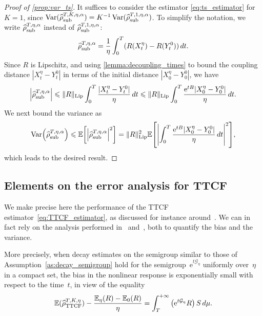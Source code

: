 \documentclass[11pt]{article}
\newcommand{\E}{\mathbb{E}}
\newcommand{\e}{\mathrm{e}}
\renewcommand{\leq}{\leqslant}
\DeclareMathOperator{\Var}{Var}
\DeclarePairedDelimiter\abs{\lvert}{\rvert}
\DeclarePairedDelimiter\paren{\lparen}{\rparen}
\DeclarePairedDelimiter\bkt{\lbrack}{\rbrack}
\theoremstyle{definition}
\newcommand{\G}{\mathcal{G}}
\newcommand{\TestTTCF}{\estTmp^{T,K,\eta}_{\rm TTCF}}
\newcommand{\RLip}{\|R\|_{\rm Lip}}
\newcommand{\estTmp}{\widehat{\rho}}
\newcommand{\asTSest}{\estTmp^{T,\eta,\alpha}_{\rm sub}} %
\newcommand{\aTSest}{\estTmp^{T,K,\eta,\alpha}_{\rm sub}} %
\begin{document}
\begin{proof}[Proof of \cref{prop:var_ts}]
It suffices to consider the estimator \eqref{eq:ts_estimator} for $K=1$, since $\Var(\aTSest) = K^{-1}\Var(\widehat{\rho}^{T,1,\eta,\alpha}_{\rm sub})$. To simplify the notation, we write $\asTSest$ instead of $\widehat{\rho}^{T,1,\eta,\alpha}_{\rm sub}$:
\begin{equation}
\notag
		\asTSest = \frac{1}{\eta}\int_0^T (R(X_t^\eta) - R(Y_t^0)) \, dt.
	\end{equation}
Since $R$ is Lipschitz, and using \cref{lemma:decoupling_times} to bound the coupling distance $|X_t^\eta - Y_t^0|$ in terms of the initial distance $|X_0^\eta - Y_0^0|$, we have
\begin{align}
\notag
		\abs*{\asTSest} \leq \RLip \int_0^T \frac{|X_t^\eta - Y_t^0|}{\eta} \, dt \leq \RLip \int_0^T \frac{\e^{tB}|X_0^\eta - Y_0^0|}{\eta} \, dt.
\end{align}
We next bound the variance as
\begin{align}
\notag
		\Var\paren*{\asTSest} 
\leq \E\bkt*{\abs*{\asTSest}^2} = \RLip^2\E\bkt*{\abs*{\int_0^T \frac{\e^{tB}|X_0^\eta - Y_0^0|}{\eta} \, dt}^2},
	\end{align}
which leads to the desired result.
\end{proof}

\subsection{Elements on the error analysis for TTCF}
\label{sec:error_TTCF}

We make precise here the performance of the TTCF estimator~\eqref{eq:TTCF_estimator}, as discussed for instance around~\cite[Eqs.~(16) and~(17)]{maffioli2024}. We can in fact rely on the analysis performed in~\cite{pavliotis2024} and~\cite[Propositions~2.2 and~2.3]{pavliotis2024}, both to quantify the bias and the variance.

More precisely, when decay estimates on the semigroup similar to those of Assumption~\ref{as:decay_semigroup} hold for the semigroup~$\e^{t \G_\eta}$ uniformly over~$\eta$ in a compact set, the bias in the nonlinear response is exponentially small with respect to the time~$t$, in view of the equality
\begin{equation}
  \label{eq:bias_TTCF}
  \E(\TestTTCF) - \frac{\E_\eta(R)-\E_0(R)}{\eta} = \int_T^{+\infty} \left(\e^{t\G_\eta} R \right) S \, d\mu.
\end{equation}
\end{document}
